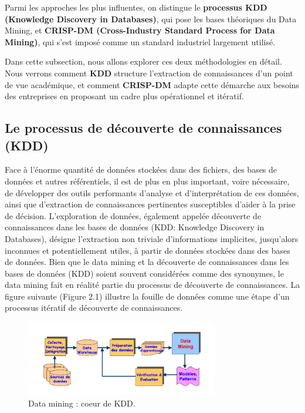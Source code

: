 \documentclass[a4paper,14pt]{article}
\begin{document}
    Parmi les approches les plus influentes, on distingue le \textbf{processus KDD (Knowledge Discovery in Databases)}, qui pose les bases théoriques du Data Mining, et \textbf{CRISP-DM (Cross-Industry Standard Process for Data Mining)}, qui s’est imposé comme un standard industriel largement utilisé.
    
    Dans cette subsection, nous allons explorer ces deux méthodologies en détail. Nous verrons comment \textbf{KDD} structure l’extraction de connaissances d’un point de vue académique, et comment \textbf{CRISP-DM} adapte cette démarche aux besoins des entreprises en proposant un cadre plus opérationnel et itératif.

    \subsection{Le processus de découverte de connaissances (KDD)}
        Face à l'énorme quantité de données stockées dans des fichiers, des bases de données et autres référentiels, il est de plus en plus important, voire nécessaire, de développer des outils performants d'analyse et d'interprétation de ces données, ainsi que d'extraction de connaissances pertinentes susceptibles d'aider à la prise de décision.
        L'exploration de données, également appelée découverte de connaissances dans les bases de données (KDD: Knowledge Discovery in Databases), désigne l'extraction non triviale d'informations implicites, jusqu'alors inconnues et potentiellement utiles, à partir de données stockées dans des bases de données. Bien que le data mining et la découverte de connaissances dans les bases de données (KDD) soient souvent considérées comme des synonymes, le data mining fait en réalité partie du processus de découverte de connaissances. La figure suivante (Figure 2.1) illustre la fouille de données comme une étape d'un processus itératif de découverte de connaissances.\\

        \begin{figure}[h]
            \centering
            \includegraphics[width=0.75\textwidth]{KDD_data_mining}
            \caption{Data mining : coeur de KDD.}
            \label{fig:mesh1}
        \end{figure}        
\end{document}
